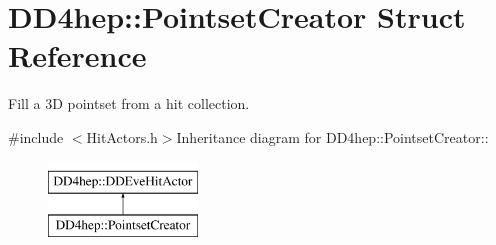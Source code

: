 \hypertarget{struct_d_d4hep_1_1_pointset_creator}{
\section{DD4hep::PointsetCreator Struct Reference}
\label{struct_d_d4hep_1_1_pointset_creator}
}


Fill a 3D pointset from a hit collection.  


{\ttfamily \#include $<$HitActors.h$>$}Inheritance diagram for DD4hep::PointsetCreator::\begin{figure}[H]
\begin{center}
\leavevmode
\includegraphics[height=2cm]{struct_d_d4hep_1_1_pointset_creator}
\end{center}
\end{figure}

